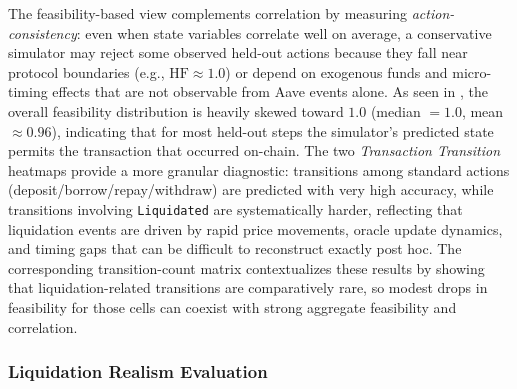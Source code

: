 \documentclass[manuscript,screen,review]{acmart}
\begin{document}
The feasibility-based view complements correlation by measuring \emph{action-consistency}: even when state variables correlate well on average, a conservative simulator may reject some observed held-out actions because they fall near protocol boundaries (e.g., $\mathrm{HF}\approx 1.0$) or depend on exogenous funds and micro-timing effects that are not observable from Aave events alone. As seen in , the overall feasibility distribution is heavily skewed toward $1.0$ (median $=1.0$, mean $\approx 0.96$), indicating that for most held-out steps the simulator's predicted state permits the transaction that occurred on-chain. The two \emph{Transaction Transition} heatmaps provide a more granular diagnostic: transitions among standard actions (deposit/borrow/repay/withdraw) are predicted with very high accuracy, while transitions involving \texttt{Liquidated} are systematically harder, reflecting that liquidation events are driven by rapid price movements, oracle update dynamics, and timing gaps that can be difficult to reconstruct exactly post hoc. The corresponding transition-count matrix contextualizes these results by showing that liquidation-related transitions are comparatively rare, so modest drops in feasibility for those cells can coexist with strong aggregate feasibility and correlation.

\subsubsection{Liquidation Realism Evaluation}
\label{sec:liquidation_realism}

\end{document}
